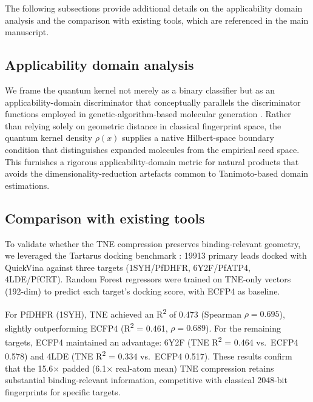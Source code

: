 \documentclass[11pt,a4paper]{article}
\begin{document}
The following subsections provide additional details on the applicability domain analysis and the comparison with existing tools, which are referenced in the main manuscript.

\subsection{Applicability domain analysis}
\label{SM-sec:applicability_domain}

We frame the quantum kernel not merely as a binary classifier but as an applicability-domain discriminator that conceptually parallels the discriminator functions employed in genetic-algorithm-based molecular generation \citep{jensen2019augmenting}. Rather than relying solely on geometric distance in classical fingerprint space, the quantum kernel density $\rho(x)$ supplies a native Hilbert-space boundary condition that distinguishes expanded molecules from the empirical seed space. This furnishes a rigorous applicability-domain metric for natural products that avoids the dimensionality-reduction artefacts common to Tanimoto-based domain estimations.


\subsection{Comparison with existing tools}


To validate whether the TNE compression preserves binding-relevant geometry, we leveraged the Tartarus docking benchmark \citep{tartarus_2024}: \num{19913} primary leads docked with QuickVina against three targets (1SYH/PfDHFR, 6Y2F/PfATP4, 4LDE/PfCRT). Random Forest regressors were trained on TNE-only vectors (\num{192}-dim) to predict each target's docking score, with ECFP4 as baseline.

For PfDHFR (1SYH), TNE achieved an R\textsuperscript{2} of \num{0.473} (Spearman $\rho = \num{0.695}$), slightly outperforming ECFP4 (R\textsuperscript{2} = \num{0.461}, $\rho = \num{0.689}$). For the remaining targets, ECFP4 maintained an advantage: 6Y2F (TNE R\textsuperscript{2} = \num{0.464} vs.\ ECFP4 \num{0.578}) and 4LDE (TNE R\textsuperscript{2} = \num{0.334} vs.\ ECFP4 \num{0.517}). These results confirm that the \num{15.6}$\times$ padded (\num{6.1}$\times$ real-atom mean) TNE compression retains substantial binding-relevant information, competitive with classical \num{2048}-bit fingerprints for specific targets.
\end{document}
